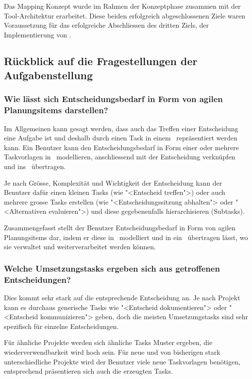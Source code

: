 		Das Mapping Konzept wurde im Rahmen der Konzeptphase zusammen mit der Tool-Architektur erarbeitet. 
		Diese beiden erfolgreich abgeschlossenen Ziele waren Voraussetzung für das erfolgreiche Abschliessen des dritten Ziels, 
		der Implementierung von \eeppi.
				
		
	
	\subsection{Rückblick auf die Fragestellungen der Aufgabenstellung}
		\subsubsection{Wie lässt sich Entscheidungsbedarf in Form von agilen Planungsitems darstellen?}
			Im Allgemeinen kann gesagt werden,
			dass auch das Treffen einer Entscheidung eine Aufgabe ist
			und deshalb durch einen Task in einem \ppt\ repräsentiert werden kann.
			Ein Benutzer kann den Entscheidungsbedarf in Form einer oder mehrere Taskvorlagen in \eeppi\ modellieren,  
			anschliessend mit der Entscheidung verknüpfen und ins \ppt\ übertragen.
			
			Je nach Grösse, Komplexität und Wichtigkeit der Entscheidung kann der Benutzer dafür einen kleinen Tasks (wie "<Entscheid treffen">) oder auch mehrere grosse Tasks erstellen (wie "<Entscheidungssitzung abhalten"> oder "<Alternativen evaluieren">) und diese gegebenenfalls hierarchisieren (Subtasks).			
			
			Zusammengefasst stellt der Benutzer Entscheidungsbedarf in Form von agilen Planungsitems dar, indem er diese in \eeppi\ modelliert und in ein \ppt\ übertragen lässt, wo sie verwaltet und weiterverarbeitet werden können.


		\subsubsection{Welche Umsetzungstasks ergeben sich aus getroffenen Entscheidungen?}
			Dies kommt sehr stark auf die entsprechende Entscheidung an.
			Je nach Projekt kann es durchaus generische Tasks wie "<Entscheid dokumentieren"> oder "<Entscheid kommunizieren"> geben,
			doch die meisten Umsetzungstasks sind sehr spezifisch für einzelne Entscheidungen.
			
			Für ähnliche Projekte werden sich ähnliche Tasks Muster ergeben, die wiederverwendbarkeit wird hoch sein.
			Für neue und von bisherigen stark unterschiedliche Projekte wird der Benutzer viele neue Taskvorlagen benötigen, 
			entsprechend präsentieren sich auch die erzeugten Tasks.
			
